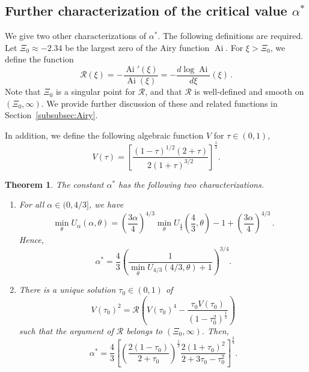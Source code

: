 \documentclass[10pt]{amsart}
\newtheorem{theo}{Theorem}[section]
\theoremstyle{definition}\newtheorem{defi}[theo]{Definition}\newtheorem{rema}[theo]{Remark}\newtheorem{exam}[theo]{Example}\newtheorem{exem}[theo]{Example}\newtheorem{nota}[theo]{Notation}
\DeclareMathOperator{\Ai}{Ai}
\newcommand{\mR}{\mathcal{R}}
\newcommand{\1}{\mathds{1}}
\newcommand*{\romanenumi}{\renewcommand*{\theenumi}{\roman{enumi}}}
\begin{document}
\subsection*{Further characterization of the critical value \texorpdfstring{$\alpha^*$}{alpha*}}



We give two other characterizations of $\alpha^*$. The following definitions are required. Let $\Xi_0\approx -2.34$ be the largest zero of the Airy function $\Ai$. For $\xi > \Xi_0$, we define the function
\begin{equation}\label{eq:riccati}
\mR(\xi) = - \frac{ \Ai'(\xi)}{ \Ai(\xi) } = - \frac{d \log \Ai}{d\xi} (\xi) \,.
\end{equation}
Note that $\Xi_0$ is a singular point for $\mR$, and that $\mR$ is well-defined and smooth on $(\Xi_0,\infty)$. We provide further discussion of these and related functions in Section~\ref{subsubsec:Airy}.


In addition, we define the following algebraic function $V$ for $\tau \in (0,1)$,
\begin{equation}\label{eq:V}
V(\tau) = \left[\frac{(1-\tau)^{1/2}(2+\tau)}{2(1+\tau)^{3/2}}\right]^\frac13.
\end{equation}


\begin{theo}\label{thm:alpha}
The constant $\alpha^*$ has the following two characterizations.
\begin{enumerate}\romanenumi
\item \label{theo1.3.1} For all $\alpha \in (0,4/3]$, we have
\begin{equation}\label{eq:U_scaling}
\min_\theta U_\alpha(\alpha,\theta) = \left(\frac{3\alpha}{4}\right)^{4/3} \min_\theta U_{\frac43}\left (\frac43, \theta\right) -1 + \left(\frac{3\alpha}{4}\right)^{4/3} \,.
\end{equation}
Hence,
\[
\alpha^* = \frac{4}{3} \left(\frac{1}{\min\limits_\theta U_{4/3}(4/3, \theta) + 1}\right)^{3/4}.
\]
\item \label{theo1.3.2} There is a unique solution $\tau_0\in (0,1)$ of
\begin{equation}\label{eq:V_condition}
V(\tau_0)^2 = \mR\left(V(\tau_0)^4 - \frac{\tau_0 V(\tau_0)}{\left (1-\tau_0^2\right)^\frac12}\right)
\end{equation}
such that the argument of $\mR$ belongs to $(\Xi_0,\infty)$. Then,
\begin{equation}\label{eq:alpha^* TH}
\alpha^* = \frac{4}{3} \left[\left(\frac{2(1-\tau_0)}{2+\tau_0}\right)^\frac13 \frac{2(1+\tau_0)^2}{2 + 3 \tau_0 - \tau_0^2} \right]^{\frac34}.
\end{equation}
\end{enumerate}
\end{theo}
\end{document}
